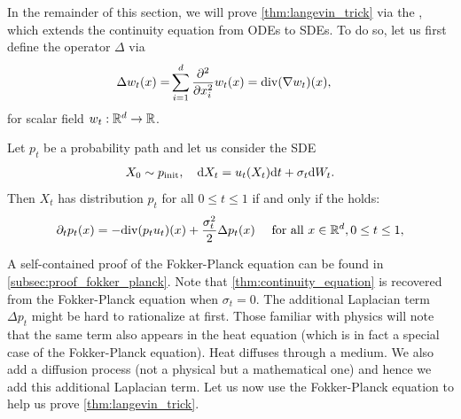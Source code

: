 In the remainder of this section, we will prove  \cref{thm:langevin_trick} via the , which extends the continuity equation from ODEs to SDEs. To do so, let us first define the  operator $\Delta$ via
\begin{align}
    \label{eq:laplacian_definition}
    \Delta w_t(x)=&\sum\limits_{i=1}^{d}\frac{\partial^2}{\partial x_i^2}w_t(x)=\mathrm{div}(\nabla w_t)(x),
\end{align}
for scalar field $w_t:\mathbb{R}^d\to\mathbb{R}$.
\begin{theorem}
\label{thm:fokker_planck}
Let $p_t$ be a probability path and let us consider the SDE
\begin{align*}
    X_0\sim p_{\rm{init}}, \quad \mathrm{d} X_t = u_t(X_t)\mathrm{d} t + \sigma_t\mathrm{d} W_t.
\end{align*}
Then $X_t$ has distribution $p_t$ for all $0\leq t\leq 1$ if and only if the  holds:
    \begin{align}
    \label{e:fokker_planck}
    \partial_t p_t(x) = -\mathrm{div} (p_t u_t)(x)+\frac{\sigma_t^2}{2}\Delta p_t (x)\quad \text{ for all }x\in\mathbb{R}^d, 0\leq t\leq 1,
    \end{align}     
\end{theorem}
A self-contained proof of the Fokker-Planck equation can be found in \cref{subsec:proof_fokker_planck}. Note that \cref{thm:continuity_equation} is recovered from the Fokker-Planck equation when $\sigma_t=0$. The additional Laplacian term $\Delta p_t$ might be hard to rationalize at first. Those familiar with physics will note that the same term also appears in the heat equation (which is in fact a special case of the Fokker-Planck equation). Heat diffuses through a medium. We also add a diffusion process (not a physical but a mathematical one) and hence we add this additional Laplacian term. 
Let us now use the Fokker-Planck equation to help us prove \cref{thm:langevin_trick}.

